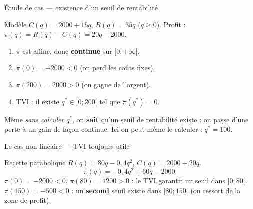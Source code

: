 \documentclass[10pt,aspectratio=169]{beamer}
\numberwithin{dummy}{section}
\newcommand{\CT}{C}
\newcommand{\Rec}{R}
\newcommand{\Prof}{\pi}
\begin{document}
\begin{frame}{Étude de cas --- existence d'un seuil de rentabilité}
\begin{block}{Modèle}
$\CT(q)=2000+15q$, \quad $\Rec(q)=35q$ \quad ($q\geqslant 0$).
Profit : $\Prof(q)=\Rec(q)-\CT(q)=20q-2000$.
\end{block}

\begin{enumerate}\setlength{\itemsep}{0.4em}
    \item $\Prof$ est affine, donc \textbf{continue} sur $[0;+\infty[$.
    \item $\Prof(0)=-2000<0$ (on perd les coûts fixes).
    \item $\Prof(200)=2000>0$ (on gagne de l'argent).
    \item TVI : il existe $q^*\in]0;200[$ tel que $\Prof(q^*)=0$.
\end{enumerate}

\vspace{0.25em}
\begin{boxsynthese}[Interprétation]
Même \emph{sans calculer} $q^*$, on \textbf{sait} qu'un seuil de rentabilité existe :
on passe d'une perte à un gain de façon continue.
Ici on peut même le calculer : $q^*=100$.
\end{boxsynthese}
\end{frame}

\begin{frame}{Le cas non linéaire --- TVI toujours utile}
\begin{exampleblock}{Recette parabolique}
$\Rec(q)=80q-0{,}4q^2$, $\CT(q)=2000+20q$.
\[
\Prof(q)=-0{,}4q^2+60q-2000.
\]
$\Prof(0)=-2000<0$, $\Prof(80)=1200>0$ : le TVI garantit un seuil dans $]0;80[$.
$\Prof(150)=-500<0$ : un \textbf{second} seuil existe dans $]80;150[$
(on ressort de la zone de profit).
\end{exampleblock}

\centering
{}
\end{frame}
\end{document}
